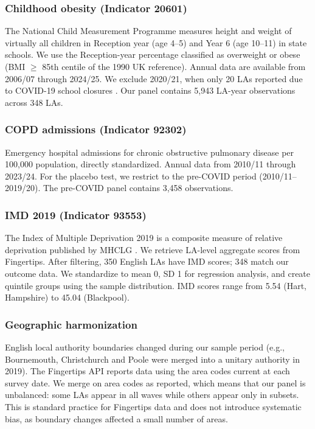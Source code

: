 \documentclass[12pt]{article}
\begin{document}
\subsubsection*{Childhood obesity (Indicator 20601)} The National Child Measurement Programme measures height and weight of virtually all children in Reception year (age 4--5) and Year 6 (age 10--11) in state schools. We use the Reception-year percentage classified as overweight or obese (BMI $\geq$ 85th centile of the 1990 UK reference). Annual data are available from 2006/07 through 2024/25. We exclude 2020/21, when only 20 LAs reported due to COVID-19 school closures \citep{ncmp2023}. Our panel contains 5,943 LA-year observations across 348 LAs.

\subsubsection*{COPD admissions (Indicator 92302)} Emergency hospital admissions for chronic obstructive pulmonary disease per 100,000 population, directly standardized. Annual data from 2010/11 through 2023/24. For the placebo test, we restrict to the pre-COVID period (2010/11--2019/20). The pre-COVID panel contains 3,458 observations.

\subsubsection*{IMD 2019 (Indicator 93553)} The Index of Multiple Deprivation 2019 is a composite measure of relative deprivation published by MHCLG \citep{noble2019}. We retrieve LA-level aggregate scores from Fingertips. After filtering, 350 English LAs have IMD scores; 348 match our outcome data. We standardize to mean 0, SD 1 for regression analysis, and create quintile groups using the sample distribution. IMD scores range from 5.54 (Hart, Hampshire) to 45.04 (Blackpool).

\subsubsection*{Geographic harmonization} English local authority boundaries changed during our sample period (e.g., Bournemouth, Christchurch and Poole were merged into a unitary authority in 2019). The Fingertips API reports data using the area codes current at each survey date. We merge on area codes as reported, which means that our panel is unbalanced: some LAs appear in all waves while others appear only in subsets. This is standard practice for Fingertips data and does not introduce systematic bias, as boundary changes affected a small number of areas.
\end{document}
